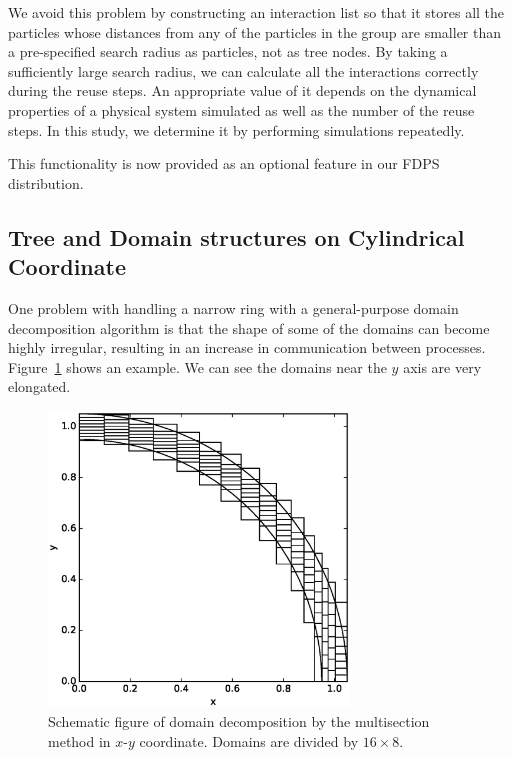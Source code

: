 \documentclass[oribibl]{llncs}
\begin{document}
We avoid this problem by constructing an interaction list so that it stores all the particles whose distances from any of the particles in the group are smaller than a pre-specified search radius as particles, not as tree nodes. By taking a sufficiently large search radius, we can calculate all the interactions correctly during the reuse steps. An appropriate value of it depends on the dynamical properties of a physical system simulated as well as the number of the reuse steps. In this study, we determine it by performing simulations repeatedly.

This functionality is now provided as an optional feature in our FDPS
distribution. 

\subsection{Tree and Domain structures on Cylindrical Coordinate}
\label{subsec:cylcoord}

One problem with handling a narrow ring with a general-purpose domain
decomposition algorithm is that the shape of some of the domains can
become highly irregular, resulting in an increase in communication
between processes. Figure~\ref{fig:domain_cart} shows an example. We
can see the domains near the $y$ axis are very elongated.

\begin{figure}
  \centering \includegraphics[width=8cm,clip]{./fig/domain_cart.eps}
  \caption{Schematic figure of domain decomposition by the multisection
    method in $x$-$y$ coordinate. Domains are divided by $16 \times 8$.}
  \label{fig:domain_cart}
\end{figure}
\end{document}
